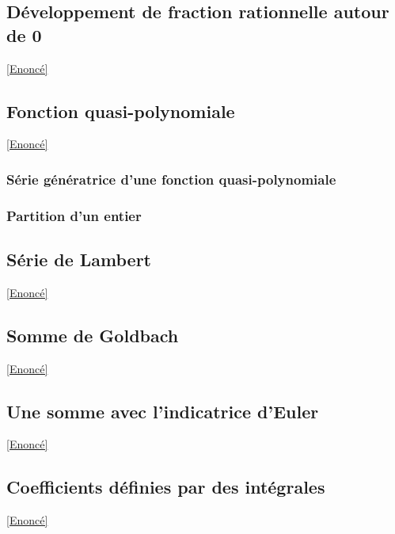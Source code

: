 \documentclass{book}
\begin{document}
	\subsection{Développement de fraction rationnelle autour de 0}
	\label{sec:developpement-de-fraction-rationnelle-autour-de-0}
	\textcolor{blue}{\hyperref[Développement de fraction rationnelle autour de 0]{[Enoncé]}}\\
	
	\subsection{Fonction quasi-polynomiale}
	\label{sec:fonction-quasi-polynomiale}
	\textcolor{blue}{\hyperref[FOnction quasi-polynomiale]{[Enoncé]}}\\
	
	\subsubsection{Série génératrice d'une fonction quasi-polynomiale}
	
	\subsubsection{Partition d'un entier}
	
	\subsection{Série de Lambert}
	\label{sec:serie-de-lambert}
	\textcolor{blue}{\hyperref[Série de Lambert]{[Enoncé]}}\\
	
	\subsection{Somme de Goldbach}
	\label{sec:somme-de-goldbach}
	\textcolor{blue}{\hyperref[Somme de Goldbach]{[Enoncé]}}\\
	
	\subsection{Une somme avec l'indicatrice d'Euler}
	\label{sec:une-somme-avec-lindicatrice-deuler}
	\textcolor{blue}{\hyperref[Une somme avec l'indicatrice d'Euler]{[Enoncé]}}\\
	
	\subsection{Coefficients définies par des intégrales}
	\label{sec:coefficients-definies-par-des-integrales}
	\textcolor{blue}{\hyperref[Coefficients définies par des intégrales]{[Enoncé]}}\\
	
\end{document}
